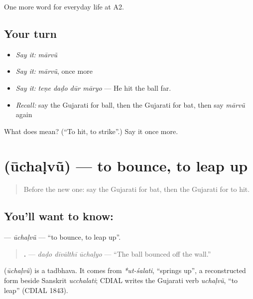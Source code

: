 \begin{grammarlens}[title={What you've built}]
One more word for everyday life at A2.
\end{grammarlens}

\subsection*{Your turn}
\begin{itemize}
\raggedright
  \item \emph{Say it:} \emph{mārvũ}
  \item \emph{Say it:} \emph{mārvũ}, once more
  \item \emph{Say it:} \emph{teṇe daḍo dūr māryo} — He hit the ball far.
  \item \emph{Recall:} say the Gujarati for ball, then the Gujarati for bat, then say \emph{mārvũ} again
\end{itemize}

\begin{tcolorbox}[breakable,colback=teal!4,colframe=teal!35!black,title={Before you move on}]
What does  mean? (\textquotedblleft{}To hit, to strike\textquotedblright{}.) Say it once more.
\end{tcolorbox}
\section[\texorpdfstring{\gu{ઊછળવું} (ūchaḷvũ)}{ઊછળવું (ūchaḷvũ)}]{ (ūchaḷvũ) — to bounce, to leap up}

\label{lesson:GU-C258-uchalvu}



\begin{quote}
Before the new one: say the Gujarati for bat, then the Gujarati for to hit.
\end{quote}

\subsection*{You'll want to know: }
\textbf{} — \emph{ūchaḷvũ} — \textquotedblleft{}to bounce, to leap up\textquotedblright{}.

\begin{quote}
\textbf{  .} — \emph{daḍo dīvālthī ūchaḷyo} — \textquotedblleft{}The ball bounced off the wall.\textquotedblright{}
\end{quote}

\begin{cousinweb}
\textbf{} (\emph{ūchaḷvũ}) is a tadbhava. It comes from \emph{*ut-śalati}, \textquotedblleft{}springs up\textquotedblright{}, a reconstructed form beside Sanskrit \emph{ucchalati}; CDIAL writes the Gujarati verb \emph{uchaḷvũ}, \textquotedblleft{}to leap\textquotedblright{} (CDIAL 1843).
\end{cousinweb}

